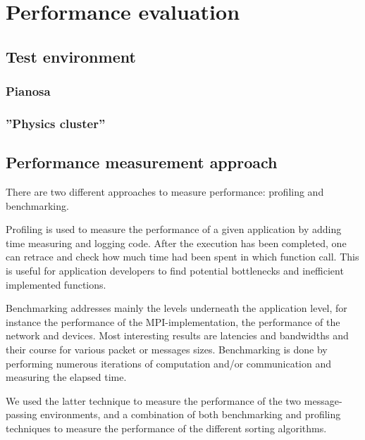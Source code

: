 \section{Performance evaluation}

\subsection{Test environment}
\subsubsection{Pianosa}
\subsubsection{''Physics cluster''}

\subsection{Performance measurement approach}
\label{test-env}
There are two different approaches to measure performance: profiling and benchmarking.

Profiling is used to measure the performance of a given application by adding time measuring and logging code. After the execution has been completed, one can retrace and check how much time had been spent in which function call. This is useful for application developers to find potential bottlenecks and inefficient implemented functions.

Benchmarking addresses mainly the levels underneath the application level, for instance the performance
of the MPI-implementation, the performance of the network and devices. Most interesting results are latencies and bandwidths and their course for various packet or messages sizes. Benchmarking is done by performing numerous iterations of computation and/or communication and measuring the elapsed time.

We used the latter technique to measure the performance of the two message-passing environments, and a combination of both benchmarking and profiling techniques to measure the performance of the different sorting algorithms.

